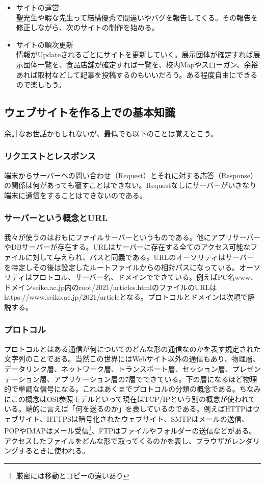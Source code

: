 \documentclass[dvipdfmx,jb5]{jarticle}
\begin{document}
\begin{itemize}
  \item サイトの運営\\
  聖光生や暇な先生って結構優秀で間違いやバグを報告してくる。その報告を修正しながら、次のサイトの制作を始める。
  \item サイトの順次更新\\
  情報がUpdateされるごとにサイトを更新していく。展示団体が確定すれば展示団体一覧を、食品店舗が確定すれば一覧を、校内Mapやスローガン、余裕あれば取材などして記事を投稿するのもいいだろう。ある程度自由にできるので楽しもう。
 \end{itemize}
 \subsection{ウェブサイトを作る上での基本知識}
 余計なお世話かもしれないが、最低でも以下のことは覚えとこう。
 \subsubsection{リクエストとレスポンス}
 端末からサーバーへの問い合わせ（Request）とそれに対する応答（Response）の関係は何があっても覆すことはできない。Requestなしにサーバーがいきなり端末に通信をすることはできないのである。
 \subsubsection{サーバーという概念とURL}
 我々が使うのはおもにファイルサーバーというものである。他にアプリサーバーやDBサーバーが存在する。URLはサーバーに存在する全てのアクセス可能なファイルに対して与えられ、パスと同義である。URLのオーソリティはサーバーを特定しその後は設定したルートファイルからの相対パスになっている。オーソリティはプロトコル、サーバー名、ドメインでできている。例えばPC名www、ドメインseiko.ac.jp内のroot/2021/articles.htmlのファイルのURLはhttps://www.seiko.ac.jp/2021/articleとなる。プロトコルとドメインは次項で解説する。
\subsubsection{プロトコル}
プロトコルとはある通信が何についてのどんな形の通信なのかを表す規定された文字列のことである。当然この世界にはWebサイト以外の通信もあり、物理層、データリンク層、ネットワーク層、トランスポート層、セッション層、プレゼンテーション層、アプリケーション層の7層でできている。下の層になるほど物理的で単調な信号になる。これはあくまでプロトコルの分類の概念である。ちなみにこの概念はOSI参照モデルといって現在はTCP/IPという別の概念が使われている。端的に言えば「何を送るのか」を表しているのである。例えばHTTPはウェブサイト、HTTPSは暗号化されたウェブサイト、SMTPはメールの送信、POPやIMAPはメール受信\footnote{厳密には移動とコピーの違いあり}、FTPはファイルやフォルダーの送信などがある。アクセスしたファイルをどんな形で取ってくるのかを表し、ブラウザがレンダリングするときに使われる。
\end{document}
